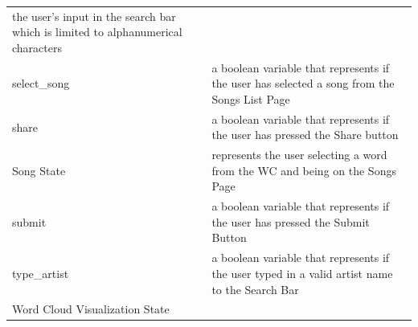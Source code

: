 \documentclass[]{article}
\begin{document}
\begin{longtable}[c]{@{}ll@{}}
\begin{minipage}[t]{0.47\columnwidth}
the user's input in the search bar which is limited to alphanumerical characters
\end{minipage}
\\\addlinespace
\begin{minipage}[t]{0.47\columnwidth}\raggedright
select\_song
\end{minipage} & \begin{minipage}[t]{0.47\columnwidth}\raggedright
a boolean variable that represents if the user has selected a song from the Songs List Page
\end{minipage}
\\\addlinespace
\begin{minipage}[t]{0.47\columnwidth}\raggedright
share
\end{minipage} & \begin{minipage}[t]{0.47\columnwidth}\raggedright
a boolean variable that represents if the user has pressed the Share button
\end{minipage}
\\\addlinespace
\begin{minipage}[t]{0.47\columnwidth}\raggedright
Song State
\end{minipage} & \begin{minipage}[t]{0.47\columnwidth}\raggedright
represents the user selecting a word from the WC and being on the Songs Page
\end{minipage}
\\\addlinespace
\begin{minipage}[t]{0.47\columnwidth}\raggedright
submit
\end{minipage} & \begin{minipage}[t]{0.47\columnwidth}\raggedright
a boolean variable that represents if the user has pressed the Submit Button
\end{minipage}
\\\addlinespace
\begin{minipage}[t]{0.47\columnwidth}\raggedright
type\_artist
\end{minipage} & \begin{minipage}[t]{0.47\columnwidth}\raggedright
a boolean variable that represents if the user typed in a valid artist name to the Search Bar
\end{minipage}
\\\addlinespace
\begin{minipage}[t]{0.47\columnwidth}\raggedright
Word Cloud Visualization State
\end{minipage} & \begin{minipage}[t]{0.47\columnwidth}\raggedright

\end{minipage}
\end{longtable}
\end{document}
